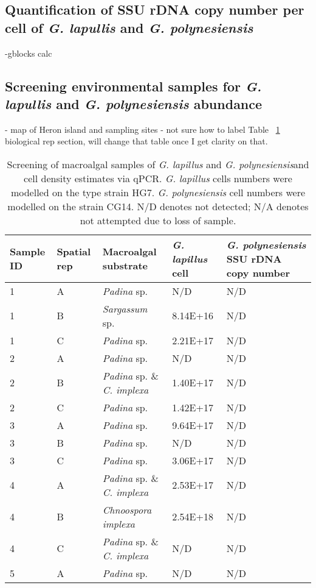 \documentclass[12pt]{article}
\begin{document}
\subsection{Quantification of SSU rDNA copy number per cell of \emph{G. lapullis} and \emph{G. polynesiensis}}
-gblocks calc
\subsection{Screening environmental samples for \emph{G. lapullis} and \emph{G. polynesiensis} abundance}
- map of Heron island and sampling sites
- not sure how to label Table ~\ref{tbl:MacroalgaeTable} biological rep section, will change that table once I get clarity on that.
\FloatBarrier
\begin{longtable}{ | p{1cm} | p{1cm} | p{3cm} | p{4cm} | p{4cm} | }
\caption{Screening of macroalgal samples of \emph{G. lapillus} and \emph{G. polynesiensis}and cell density estimates via qPCR. \emph{G. lapillus} cells numbers were modelled on the type strain HG7. \emph{G. polynesiensis} cell numbers were modelled on the strain CG14. N/D denotes not detected; N/A denotes not attempted due to loss of sample.}\\
\hline
\label{tbl:MacroalgaeTable}
\textbf{Sample ID}&\textbf{Spatial rep}&\textbf{Macroalgal substrate}&\textbf{\textit{G. lapillus} cell}&\textbf{\textit{G. polynesiensis} SSU rDNA copy number }\\
\hline
1&A&\emph{Padina} sp.&N/D&N/D\\
\hline
1&B&\emph{Sargassum} sp.&8.14E+16
&N/D\\
\hline
1&C&\emph{Padina} sp.&2.21E+17
&N/D\\
\hline
2&A&\emph{Padina} sp.&N/D&N/D\\
\hline
2&B&\emph{Padina} sp. \& \emph{C. implexa}&1.40E+17
&N/D\\
\hline
2&C&\emph{Padina} sp.&1.42E+17
&N/D\\
\hline
3&A&\emph{Padina} sp.&9.64E+17
&N/D\\
\hline
3&B&\emph{Padina} sp.&N/D&N/D\\
\hline
3&C&\emph{Padina} sp.&3.06E+17
&N/D\\
\hline
4&A&\emph{Padina} sp. \& \emph{C. implexa}&2.53E+17
&N/D\\
\hline
4&B&\emph{Chnoospora implexa}&2.54E+18
&N/D\\
\hline
4&C&\emph{Padina} sp. \& \emph{C. implexa}&N/D&N/D\\
\hline
5&A&\emph{Padina} sp.&N/D&N/D\\

\end{longtable}
\end{document}

